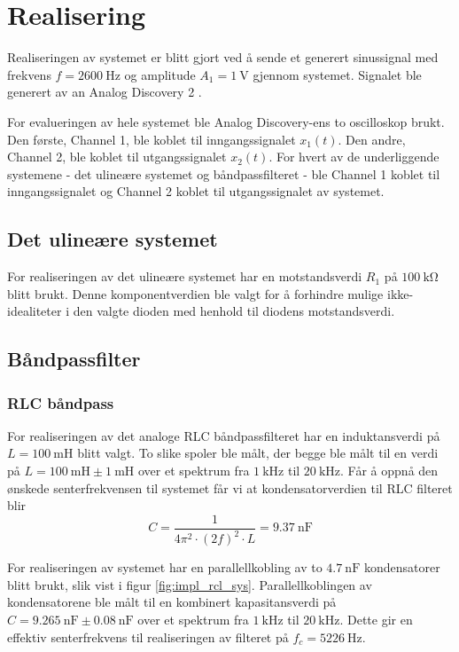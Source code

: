 \section{Realisering}
\label{realiseringOgTest}

Realiseringen av systemet er blitt gjort ved å sende et generert sinussignal 
med frekvens $f = \SI{2600}{\hertz}$ og amplitude $A_1 = \SI{1}{\volt}$ gjennom systemet.
Signalet ble generert av an Analog Discovery 2 \cite{analog_discovery}. 

For evalueringen av hele systemet ble Analog Discovery-ens to oscilloskop brukt. Den første, Channel 1,
ble koblet til inngangssignalet $x_1(t)$. Den andre, Channel 2, ble koblet 
til utgangssignalet $x_2(t)$.
For hvert av de underliggende systemene - det ulineære systemet og båndpassfilteret - ble 
Channel 1 koblet til inngangssignalet og Channel 2 koblet til utgangssignalet av systemet.

\subsection{Det ulineære systemet}
For realiseringen av det ulineære systemet har en motstandsverdi $R_1$ på $\SI{100}{\kilo\ohm}$ blitt brukt. Denne komponentverdien 
ble valgt for å forhindre mulige ikke-idealiteter i den valgte dioden med henhold til diodens motstandsverdi.

\subsection{Båndpassfilter}

\subsubsection{RLC båndpass}
For realiseringen av det analoge RLC båndpassfilteret har en induktansverdi på $L = \SI{100}{\milli\henry}$ blitt valgt. To slike spoler ble 
målt, der begge ble målt til en verdi på $L = \SI{100}{\milli\henry} \pm \SI{1}{\milli\henry}$ over et spektrum fra $\SI{1}{\kilo\hertz}$ til $\SI{20}{\kilo\hertz}$. 
Får å oppnå den ønskede senterfrekvensen til systemet får vi at kondensatorverdien til 
RLC filteret blir 
\[
    C = \frac{1}{4\pi^2 \cdot (2f)^2 \cdot L} = \SI{9.37}{\nano\farad}
\]

For realiseringen av systemet har en parallellkobling av to $\SI{4.7}{\nano\farad}$
kondensatorer blitt brukt, slik vist i figur \ref{fig:impl_rcl_sys}.
Parallellkoblingen av kondensatorene ble målt til en kombinert kapasitansverdi på $C = \SI{9.265}{\nano\farad} \pm \SI{0.08}{\nano\farad}$ over et spektrum fra $\SI{1}{\kilo\hertz}$ til $\SI{20}{\kilo\hertz}$.
Dette gir en effektiv senterfrekvens til realiseringen av filteret på $f_c = \SI{5226}{\hertz}$.

